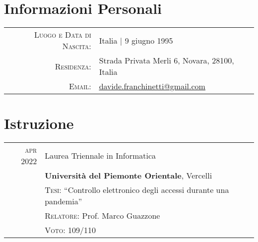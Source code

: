 \documentclass[a4paper,10pt]{article} %
\begin{document}
\pagestyle{empty} %


\par{\bigskip\par} %

\section{Informazioni Personali}

\begin{tabular}{rl}
\textsc{Luogo e Data di Nascita:} & Italia | 9 giugno 1995 \\
\textsc{Residenza:} & Strada Privata Merli 6, Novara, 28100, Italia \\
\textsc{Email:} & \href{mailto:davide.franchinetti@gmail.com}{\underline{davide.franchinetti@gmail.com}}\\
\end{tabular}


\section{Istruzione}

\begin{tabular}{rl}	
\textsc{apr 2022} & Laurea Triennale in Informatica\\
& \textbf{Università del Piemonte Orientale}, Vercelli\\
& \textsc{Tesi:} ``Controllo elettronico degli accessi durante una pandemia''\\
& \small \textsc{Relatore:} Prof. Marco Guazzone\\
& \normalsize \textsc{Voto:} 109/110\\
\end{tabular}
\end{document}
